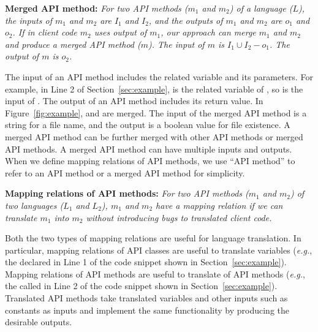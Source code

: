 \textbf{Merged API method:} \emph{For two API methods ($m_1$ and
$m_2$) of a language ($L$), the inputs of $m_1$ and $m_2$ are $I_1$
and $I_2$, and the outputs of $m_1$ and $m_2$ are $o_1$ and $o_2$.
If in client code $m_2$ uses output of $m_1$, our approach can merge
$m_1$ and $m_2$ and produce a merged API method ($m$). The input of
$m$ is $I_1\cup I_2-o_1$. The output of $m$ is $o_2$.}

The input of an API method includes the related variable and its
parameters. For example, in Line 2 of Section~\ref{sec:example},
 is the related variable of , so
 is the input of . The output of an API
method includes its return value. In Figure~\ref{fig:example},
 and  are merged. The input of the
merged API method is a string for a file name, and the output is a
boolean value for file existence. A merged API method can be further
merged with other API methods or merged API methods. A merged API
method can have multiple inputs and outputs. When we define mapping
relations of API methods, we use ``API method'' to refer to an API
method or a merged API method for simplicity.

\textbf{Mapping relations of API methods:} \emph{For two API methods
($m_1$ and $m_2$) of two languages ($L_1$ and $L_2$), $m_1$ and
$m_2$ have a mapping relation if we can translate $m_1$ into $m_2$
without introducing bugs to translated client code.}

Both the two types of mapping relations are useful for language
translation. In particular, mapping relations of API classes are
useful to translate variables (\emph{e.g.}, the declared
 in Line 1 of the code snippet shown in
Section~\ref{sec:example}). Mapping relations of API methods are
useful to translate of API methods (\emph{e.g.}, the called
 in Line 2 of the code snippet shown in
Section~\ref{sec:example}). Translated API methods take translated
variables and other inputs such as constants as inputs and implement
the same functionality by producing the desirable outputs.
